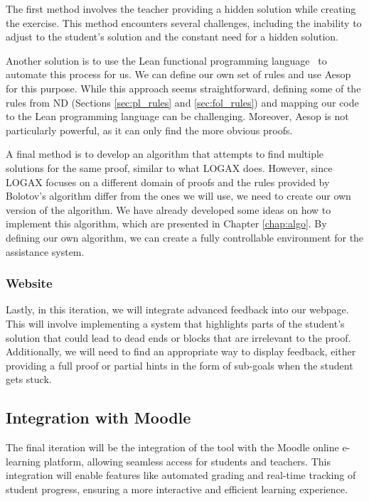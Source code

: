 The first method involves the teacher providing a hidden solution while creating the exercise. This method encounters several challenges, including the inability to adjust to the student's solution and the constant need for a hidden solution.

Another solution is to use the Lean functional programming language~\cite{programming} to automate this process for us. We can define our own set of rules and use Aesop~\cite{leanprovercommunity_2021_github} for this purpose. While this approach seems straightforward, defining some of the rules from \gls{ND} (Sections \ref{sec:pl_rules} and \ref{sec:fol_rules}) and mapping our code to the Lean programming language can be challenging. Moreover, Aesop is not particularly powerful, as it can only find the more obvious proofs.

A final method is to develop an algorithm that attempts to find multiple solutions for the same proof, similar to what LOGAX does. However, since LOGAX focuses on a different domain of proofs and the rules provided by Bolotov's algorithm differ from the ones we will use, we need to create our own version of the algorithm. We have already developed some ideas on how to implement this algorithm, which are presented in Chapter \ref{chap:algo}. By defining our own algorithm, we can create a fully controllable environment for the assistance system.

\subsubsection{Website}
Lastly, in this iteration, we will integrate advanced feedback into our webpage. This will involve implementing a system that highlights parts of the student's solution that could lead to dead ends or blocks that are irrelevant to the proof. Additionally, we will need to find an appropriate way to display feedback, either providing a full proof or partial hints in the form of sub-goals when the student gets stuck.

\subsection{Integration with Moodle}
The final iteration will be the integration of the tool with the Moodle online e-learning platform, allowing seamless access for students and teachers. This integration will enable features like automated grading and real-time tracking of student progress, ensuring a more interactive and efficient learning experience.


